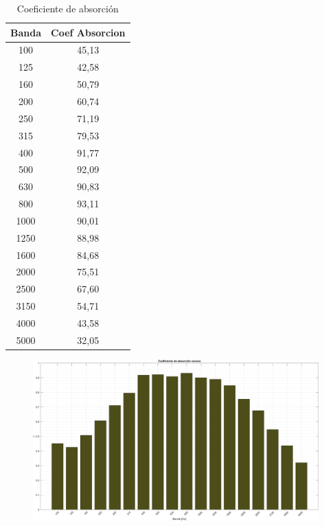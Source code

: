 \begin{table}[]
\setlength\arrayrulewidth{1pt}
    \centering
    \begin{tabular}{|c|c|} \hline
        \textbf{Banda} & Coef Absorcion \\ \hline \hline
        100 & 45,13\\ \hline
        125	& 42,58\\ \hline
        160	& 50,79\\ \hline
        200	& 60,74\\ \hline
        250	& 71,19\\ \hline
        315	& 79,53\\ \hline
        400	& 91,77\\ \hline
        500	& 92,09\\ \hline
        630	& 90,83\\ \hline
        800	& 93,11\\ \hline
        1000&	90,01\\ \hline
        1250&	88,98\\ \hline
        1600&	84,68\\ \hline
        2000&	75,51\\ \hline
        2500&	67,60\\ \hline
        3150&	54,71\\ \hline
        4000&	43,58\\ \hline
        5000&	32,05\\ \hline
    \end{tabular}
    \caption{Coeficiente de absorción}
    \label{tab:coef_absorcion_sonora}
\end{table}



\begin{figure}[H]
	\centering
	\includegraphics[width=0.98\textwidth]{./img/Coef_absorcion_sonora_bars.png}
	\caption{}
	\label{fig::coef_absorcion_sonora}
\end{figure}


